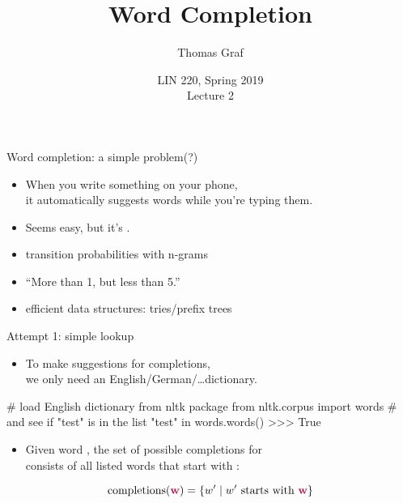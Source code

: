 \documentclass[professionalfonts, xcolor={usenames,svgnames,x11names,table}]{beamer}
\title{Word Completion}
\author{Thomas Graf}
\institute{Stony Brook University\\\texttt{lin120@thomasgraf.net}}
\date{LIN 220, Spring 2019\\Lecture 2}
\begin{document}
\unnumbered{
\begin{frame}
	\titlepage
\end{frame}
}

\begin{frame}{Word completion: a simple problem(?)}
    \begin{itemize}
        \item When you write something on your phone,\\
              it automatically suggests words while you're typing them.
        \item Seems easy, but it's .
    \end{itemize}

    \begin{lessons}
        \begin{itemize}
            \item transition probabilities with n-grams
            \item ``More than 1, but less than 5.''
            \item efficient data structures: tries\slash prefix trees
        \end{itemize}
    \end{lessons}
\end{frame}

\begin{frame}[fragile]{Attempt 1: simple lookup}
    \begin{itemize}
        \item To make suggestions for completions,\\
              we only need an English\slash German\slash\ldots dictionary.
    \end{itemize}

    \begin{pythoncode}
        # load English dictionary from nltk package
        from nltk.corpus import words
        # and see if "test" is in the list
        "test" in words.words()
        >>> True
    \end{pythoncode}

    \begin{itemize}
        \item Given word , the set of possible completions for \\
              consists of all listed words that start with :
    \end{itemize}

    \[
        \text{completions}(\textbf{\color{purple}w}) =
            \{ w' \mid w' \text{ starts with } \textbf{\color{purple}w} \}
    \]
\end{frame}
\end{document}
